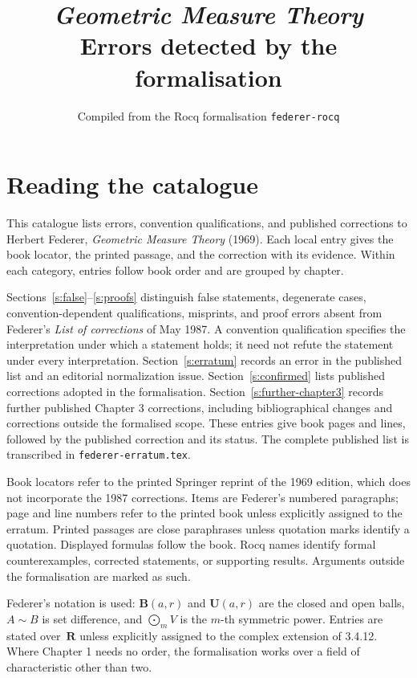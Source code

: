 \documentclass[11pt]{article}
\title{\textit{Geometric Measure Theory}\\Errors detected by the formalisation}
\author{Compiled from the Rocq formalisation \texttt{federer-rocq}}
\date{}
\newcommand{\R}{\mathbf R}
\newcommand{\U}{\mathbf U}
\newcommand{\B}{\mathbf B}
\begin{document}
\maketitle
\setcounter{tocdepth}{2}
\tableofcontents
\bigskip

\section*{Reading the catalogue}

This catalogue lists errors, convention qualifications, and published
corrections to Herbert Federer, \textit{Geometric Measure Theory} (1969).
Each local entry gives the book locator, the printed passage, and the
correction with its evidence. Within each category, entries follow book
order and are grouped by chapter.

Sections~\ref{s:false}--\ref{s:proofs} distinguish false statements,
degenerate cases, convention-dependent qualifications, misprints, and
proof errors absent from Federer's \textit{List of corrections} of May
1987. A convention qualification specifies the interpretation under which
a statement holds; it need not refute the statement under every
interpretation. Section~\ref{s:erratum} records an error in the published
list and an editorial normalization issue. Section~\ref{s:confirmed}
lists published corrections adopted in the formalisation.
Section~\ref{s:further-chapter3} records further published Chapter 3
corrections, including bibliographical changes and corrections outside
the formalised scope. These entries give book pages and lines, followed
by the published correction and its status. The complete published list
is transcribed in \texttt{federer-erratum.tex}.

Book locators refer to the printed Springer reprint of the 1969 edition,
which does not incorporate the 1987 corrections. Items are Federer's
numbered paragraphs; page and line numbers refer to the printed book
unless explicitly assigned to the erratum. Printed passages are close
paraphrases unless quotation marks identify a quotation. Displayed
formulas follow the book. Rocq names identify formal counterexamples,
corrected statements, or supporting results. Arguments outside the
formalisation are marked as such.

Federer's notation is used: $\B(a,r)$ and $\U(a,r)$ are the closed and
open balls, $A\sim B$ is set difference, and $\bigodot_m V$ is the $m$-th
symmetric power. Entries are stated over~$\R$ unless explicitly assigned to the complex
extension of 3.4.12. Where Chapter 1 needs no order, the formalisation
works over a field of characteristic other than two.
\end{document}
